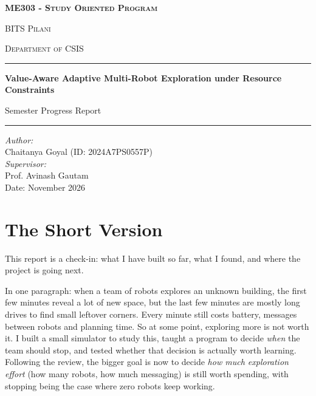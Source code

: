 \documentclass[11pt,a4paper]{article}
\begin{document}
\begin{titlepage}
\centering
\vspace*{2.2cm}
{\Large\textbf{ME303 - \textsc{Study Oriented Program}}\par}
\vspace{0.9cm}
{\Large BITS \textsc{Pilani}\par}
\vspace{0.3cm}
{\large \textsc{Department of CSIS}\par}
\vspace{1.4cm}
\rule{\linewidth}{0.8pt}\par\vspace{0.3cm}
{\huge\bfseries Value-Aware Adaptive Multi-Robot Exploration under Resource Constraints\par}
\vspace{0.3cm}
{\Large Semester Progress Report\par}
\vspace{0.2cm}
\rule{\linewidth}{0.8pt}\par
\vspace{1.8cm}
\begin{flushleft}
\textit{Author:}\\
Chaitanya Goyal (ID: 2024A7PS0557P)\\[0.8em]
\textit{Supervisor:}\\
Prof. Avinash Gautam\\
\vspace{3.2cm}
Date: November 2026
\end{flushleft}
\end{titlepage}

\section{The Short Version}

This report is a check-in: what I have built so far, what I found, and where the project is going next.

In one paragraph: when a team of robots explores an unknown building, the first few minutes reveal a lot of new space, but the last few minutes are mostly long drives to find small leftover corners. Every minute still costs battery, messages between robots and planning time. So at some point, exploring more is not worth it. I built a small simulator to study this, taught a program to decide \emph{when} the team should stop, and tested whether that decision is actually worth learning. Following the review, the bigger goal is now to decide \emph{how much exploration effort} (how many robots, how much messaging) is still worth spending, with stopping being the case where zero robots keep working.
\end{document}
